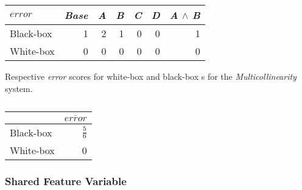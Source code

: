     \begin{table}[H]
        \begin{minipage}{.5\linewidth}
            \centering
            \begin{tabular}{lrrrrrr}    \toprule
            $error$    & \emph{Base} & \emph{A} & \emph{B} & \emph{C} & \emph{D} & \emph{A} $\land$ \emph{B}   \\ \midrule
            Black-box & 1 & 2 & 1 & 0 & 0 & 1      \\
            White-box & 0 & 0 & 0 & 0 & 0 & 0      \\ \bottomrule
            \end{tabular}
            \caption{Respective \emph{error} scores for white-box and black-box {\perfInfluenceModel}s for the \emph{Multicollinearity} system.}
        \end{minipage}%
        \hspace{7mm}
        \begin{minipage}{.3\linewidth}
            \centering
            \begin{tabular}{lr}
                \toprule
                          & $\overline{error}$   \\ \midrule
                Black-box & $\frac{5}{6}$              \\
                White-box & 0              \\ \bottomrule
                \end{tabular}
                \caption{}
            \end{minipage}
        \end{table}

        \subsubsection*{Shared Feature Variable} %

